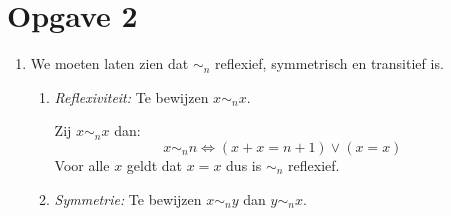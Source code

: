 \documentclass{article}
\begin{document}
\section*{Opgave 2}
\begin{enumerate}[label=\alph*)]
    \item
          We moeten laten zien dat $\sim_n$ reflexief, symmetrisch en transitief is.
          \begin{enumerate}[label=\arabic*.]
              \item \emph{Reflexiviteit:} Te bewijzen $x \sim_n x$.

                    Zij $x \sim_n x$ dan:
                    \[x \sim_n n \iff (x + x = n + 1) \vee (x = x)\]
                    Voor alle $x$ geldt dat $x = x$ dus is $\sim_n$ reflexief.
              \item \emph{Symmetrie:} Te bewijzen $x \sim_n y$ dan $y \sim_n x$.


\end{enumerate}
\end{enumerate}
\end{document}
